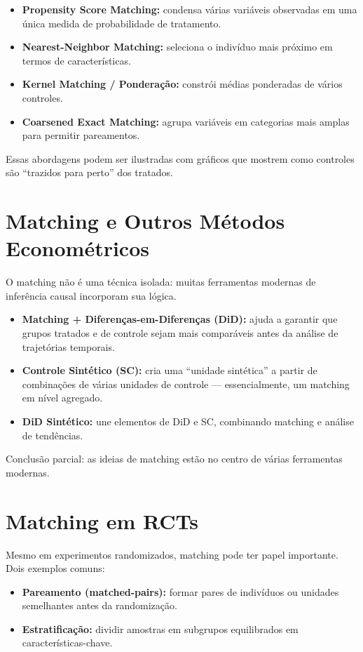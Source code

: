 \documentclass[12pt]{article}
\begin{document}
\begin{itemize}[topsep=2pt,itemsep=2pt]
    \item \textbf{Propensity Score Matching:} condensa várias variáveis observadas em uma única medida de probabilidade de tratamento.
    \item \textbf{Nearest-Neighbor Matching:} seleciona o indivíduo mais próximo em termos de características.
    \item \textbf{Kernel Matching / Ponderação:} constrói médias ponderadas de vários controles.
    \item \textbf{Coarsened Exact Matching:} agrupa variáveis em categorias mais amplas para permitir pareamentos.
\end{itemize}

Essas abordagens podem ser ilustradas com gráficos que mostrem como controles são ``trazidos para perto'' dos tratados.

\section{Matching e Outros Métodos Econométricos}
O matching não é uma técnica isolada: muitas ferramentas modernas de inferência causal incorporam sua lógica.

\begin{itemize}[topsep=2pt,itemsep=2pt]
    \item \textbf{Matching + Diferenças-em-Diferenças (DiD):} ajuda a garantir que grupos tratados e de controle sejam mais comparáveis antes da análise de trajetórias temporais.
    \item \textbf{Controle Sintético (SC):} cria uma ``unidade sintética'' a partir de combinações de várias unidades de controle — essencialmente, um matching em nível agregado.
    \item \textbf{DiD Sintético:} une elementos de DiD e SC, combinando matching e análise de tendências.
\end{itemize}

Conclusão parcial: as ideias de matching estão no centro de várias ferramentas modernas.

\section{Matching em RCTs}
Mesmo em experimentos randomizados, matching pode ter papel importante.  
Dois exemplos comuns:

\begin{itemize}[topsep=2pt,itemsep=2pt]
    \item \textbf{Pareamento (matched-pairs):} formar pares de indivíduos ou unidades semelhantes antes da randomização.
    \item \textbf{Estratificação:} dividir amostras em subgrupos equilibrados em características-chave.
\end{itemize}
\end{document}
